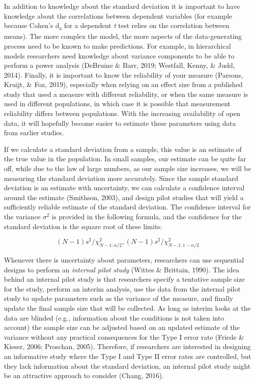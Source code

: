 \documentclass[
  english,
  ,jou, a4paper,floatsintext]{apa6}
\begin{document}
In addition to knowledge about the standard deviation it is important to have knowledge about the correlations between dependent variables (for example because Cohen's d\textsubscript{z} for a dependent \emph{t} test relies on the correlation between means). The more complex the model, the more aspects of the data-generating process need to be known to make predictions. For example, in hierarchical models researchers need knowledge about variance components to be able to perform a power analysis (DeBruine \& Barr, 2019; Westfall, Kenny, \& Judd, 2014). Finally, it is important to know the reliability of your measure (Parsons, Kruijt, \& Fox, 2019), especially when relying on an effect size from a published study that used a measure with different reliability, or when the same measure is used in different populations, in which case it is possible that measurement reliability differs between populations. With the increasing availability of open data, it will hopefully become easier to estimate these parameters using data from earlier studies.

If we calculate a standard deviation from a sample, this value is an estimate of the true value in the population. In small samples, our estimate can be quite far off, while due to the law of large numbers, as our sample size increases, we will be measuring the standard deviation more accurately. Since the sample standard deviation is an estimate with uncertainty, we can calculate a confidence interval around the estimate (Smithson, 2003), and design pilot studies that will yield a sufficiently reliable estimate of the standard deviation. The confidence interval for the variance \(\sigma^2\) is provided in the following formula, and the confidence for the standard deviation is the square root of these limits:

\[(N - 1)s^2/\chi^2_{N-1:\alpha/2},(N - 1)s^2/\chi^2_{N-1:1-\alpha/2}\]

Whenever there is uncertainty about parameters, researchers can use sequential designs to perform an \emph{internal pilot study} (Wittes \& Brittain, 1990). The idea behind an internal pilot study is that researchers specify a tentative sample size for the study, perform an interim analysis, use the data from the internal pilot study to update parameters such as the variance of the measure, and finally update the final sample size that will be collected. As long as interim looks at the data are blinded (e.g., information about the conditions is not taken into account) the sample size can be adjusted based on an updated estimate of the variance without any practical consequences for the Type I error rate (Friede \& Kieser, 2006; Proschan, 2005). Therefore, if researchers are interested in designing an informative study where the Type I and Type II error rates are controlled, but they lack information about the standard deviation, an internal pilot study might be an attractive approach to consider (Chang, 2016).
\end{document}
